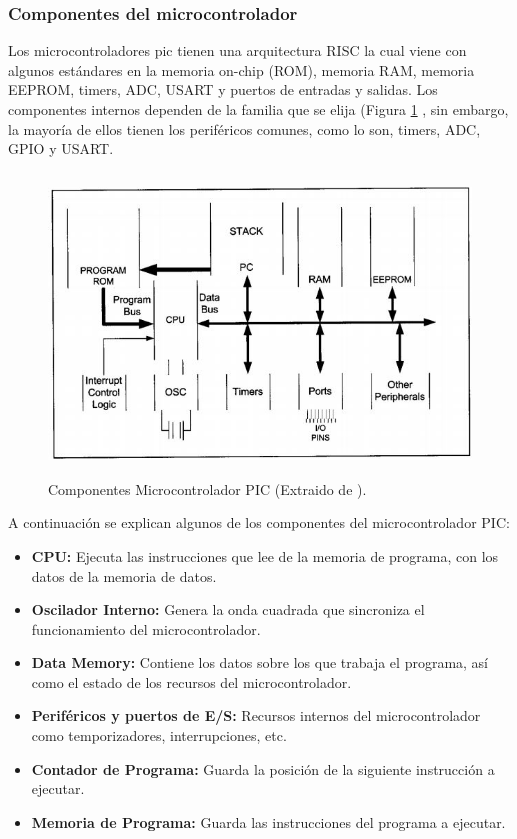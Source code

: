 \documentclass[12pt,a4paper]{article}
\begin{document}
   \subsubsection{Componentes del microcontrolador}
   Los microcontroladores pic tienen una arquitectura RISC la cual viene con algunos estándares en la memoria on-chip (ROM), memoria RAM, memoria EEPROM, timers, ADC, USART  y puertos de entradas y salidas. Los componentes internos dependen de la familia que se elija (Figura \ref{fig:ComponentesPIC} , sin embargo, la mayoría de ellos tienen los periféricos comunes, como lo son, timers, ADC, GPIO y USART\cite{Muha}.
   
   \begin{figure}[htpb]
   \centering
   \includegraphics[height=8cm]{ComponentesPIC}
   \caption{Componentes Microcontrolador PIC (Extraido de \cite{Muha}).}
   \label{fig:ComponentesPIC}
   \end{figure}
   
   A continuación se explican algunos de los componentes del microcontrolador PIC:
   \begin{itemize}
   		\item \textbf{CPU:} Ejecuta las instrucciones que lee de la memoria de programa, con los datos de la memoria de datos.
   		\item \textbf{Oscilador Interno:} Genera la onda cuadrada que sincroniza el funcionamiento del microcontrolador.
   		\item \textbf{Data Memory:} Contiene los datos sobre los que trabaja el programa, así como el estado de los recursos del microcontrolador.
   		\item \textbf{Periféricos y puertos de E/S:} Recursos internos del microcontrolador como temporizadores, interrupciones, etc.
   		\item \textbf{Contador de Programa:} Guarda la posición de la siguiente instrucción a ejecutar.
   		\item \textbf{Memoria de Programa:} Guarda las instrucciones del programa a ejecutar.
   		
   \end{itemize}
   
\end{document}
